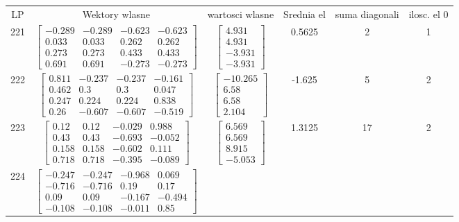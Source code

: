 \documentclass[a4paper,12pt]{article}
\begin{document}
\bgroup {} \vspace{0.2in} \begin{tabular}{c c c c c c}
LP &Wektory wlasne & wartosci wlasne & Srednia el & suma diagonali & ilosc. el 0\\
221
&
$\begin{bmatrix} -0.289 & -0.289 & -0.623 & -0.623 \\ 0.033 & 0.033 & 0.262 & 0.262 \\ 0.273 & 0.273 & 0.433 & 0.433 \\ 0.691 & 0.691 & -0.273 & -0.273 \end{bmatrix}$
&
$\begin{bmatrix} 4.931 \\ 4.931 \\ -3.931 \\ -3.931 \end{bmatrix}$
&
0.5625
&
2
&
1
\\
222
&
$\begin{bmatrix} 0.811 & -0.237 & -0.237 & -0.161 \\ 0.462 & 0.3 & 0.3 & 0.047 \\ 0.247 & 0.224 & 0.224 & 0.838 \\ 0.26 & -0.607 & -0.607 & -0.519 \end{bmatrix}$
&
$\begin{bmatrix} -10.265 \\ 6.58 \\ 6.58 \\ 2.104 \end{bmatrix}$
&
-1.625
&
5
&
2
\\
223
&
$\begin{bmatrix} 0.12 & 0.12 & -0.029 & 0.988 \\ 0.43 & 0.43 & -0.693 & -0.052 \\ 0.158 & 0.158 & -0.602 & 0.111 \\ 0.718 & 0.718 & -0.395 & -0.089 \end{bmatrix}$
&
$\begin{bmatrix} 6.569 \\ 6.569 \\ 8.915 \\ -5.053 \end{bmatrix}$
&
1.3125
&
17
&
2
\\
224
&
$\begin{bmatrix} -0.247 & -0.247 & -0.968 & 0.069 \\ -0.716 & -0.716 & 0.19 & 0.17 \\ 0.09 & 0.09 & -0.167 & -0.494 \\ -0.108 & -0.108 & -0.011 & 0.85 \end{bmatrix}$

\end{tabular}
\end{document}
